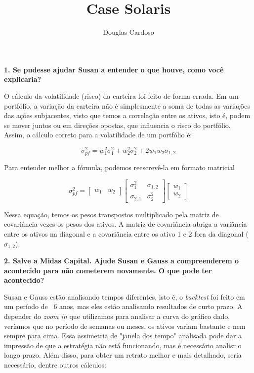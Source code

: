 \documentclass[12pt]{article}
\begin{document}
\title{Case Solaris}
\author{Douglas Cardoso}
\maketitle

\textbf{1. Se pudesse ajudar Susan a entender o que houve, como você explicaria?}

O cálculo da volatilidade (risco) da carteira foi feito de forma errada. Em um portfólio, a variação da carteira não é simplesmente a soma de todas as variações das ações subjacentes, visto que temos a correlação entre os ativos, isto é, podem se mover juntos ou em direções opostas, que influencia o risco do portfólio. Assim, o cálculo correto para a volatilidade de um portfólio é:

$$
\sigma_{pf}^2 = w_1^2 \sigma_1^2 + w_2^2 \sigma_2^2 + 2w_1 w_2\sigma_{1,2}$$

Para entender melhor a fórmula, podemos reescrevê-la em formato matricial

\begin{equation*}
\sigma_{pf}^2 = 
\begin{bmatrix}
w_1 & w_2
\end{bmatrix}
\begin{bmatrix}
\sigma_1^2 & \sigma_{1,2}\\
\sigma_{2,1} & \sigma_2^2
\end{bmatrix}
\begin{bmatrix}
w_1\\
w_2
\end{bmatrix}
\end{equation*}

Nessa equação, temos os pesos transpostos multiplicado pela matriz de covariância vezes os pesos dos ativos. A matriz de covariância abriga a variância entre os ativos na diagonal e a covariância entre os ativo 1 e 2 fora da diagonal ($\sigma_{1,2}$). 



\textbf{2. Salve a Midas Capital. Ajude Susan e Gauss a compreenderem o acontecido para não cometerem novamente. O que pode ter acontecido?}

Susan e Gauss estão analisando tempos diferentes, isto é, o \textit{backtest} foi feito em um período de ~6 anos, mas eles estão analisando resultados de curto prazo. A depender do \textit{zoom in} que utilizamos para analisar a curva do gráfico dado, veríamos que no período de semanas ou meses, os ativos variam bastante e nem sempre para cima. Essa assimetria de "janela dos tempo" analisada pode dar a impressão de que a estratégia não está funcionando, mas é necessário analisr o longo prazo. Além disso, para obter um retrato melhor e mais detalhado, seria necessário, dentre outros cálculos:
\end{document}
